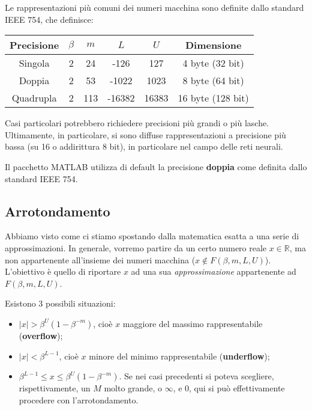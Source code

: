 \documentclass[a4paper,11pt]{article}
\begin{document}
Le rappresentazioni più comuni dei numeri macchina sono definite dallo standard IEEE 754, che definisce:

\begin{table}[h!]
	\center {}
	\begin{tabular} { c | c | c | c | c | c }
		\bfseries Precisione & \bfseries $\beta$ & \bfseries $m$ & \bfseries $L$ & \bfseries $U$ & \bfseries Dimensione \\ 
		\hline
		Singola & 2 & 24 & -126 & 127 & 4 byte (32 bit) \\ 
		Doppia & 2 & 53 & -1022 & 1023 & 8 byte (64 bit) \\ 
		Quadrupla & 2 & 113 & -16382 & 16383 & 16 byte (128 bit) \\ 
	\end{tabular}
\end{table}

Casi particolari potrebbero richiedere precisioni più grandi o più lasche.
Ultimamente, in particolare, si sono diffuse rappresentazioni a precisione più bassa (su 16 o addirittura 8 bit), in particolare nel campo delle reti neurali.

Il pacchetto MATLAB utilizza di default la precisione \textbf{doppia} come definita dallo standard IEEE 754.

\subsection{Arrotondamento}
Abbiamo visto come ci stiamo spostando dalla matematica esatta a una serie di approssimazioni.
In generale, vorremo partire da un certo numero reale $x \in \mathbb{R}$, ma non appartenente all'insieme dei numeri macchina ($x \not \in F(\beta, m, L ,U)$).
L'obiettivo è quello di riportare $x$ ad una sua \textit{approssimazione} appartenente ad $F(\beta, m, L, U)$.

Esistono 3 possibili situazioni:
\begin{itemize}
	\item $|x| > \beta^U (1 - \beta^{-m})$, cioè $x$ maggiore del massimo rappresentabile (\textbf{overflow});
	\item $|x| < \beta^{L - 1}$, cioè $x$ minore del minimo rappresentabile (\textbf{underflow});
	\item $\beta^{L - 1} \leq x \leq \beta^U (1 - \beta^{-m})$. Se nei casi precedenti si poteva scegliere, rispettivamente, un $M$ molto grande, o  $\infty$, e $0$, qui si può effettivamente procedere con l'arrotondamento.
\end{itemize}
\end{document}
